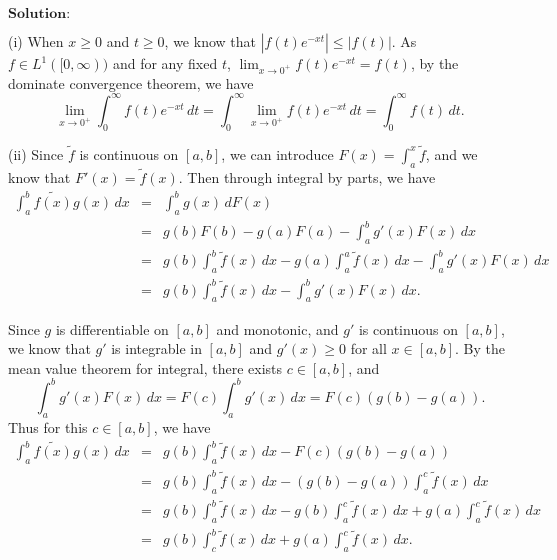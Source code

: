 \documentclass[12pt,a4paper]{ctexart}
\begin{document}
\vspace{8pt}
$\textbf{Solution:}$

(i) When $x \geq 0$ and $t \geq 0$, we know that $|f(t) e^{- x t}| \leq |f(t)|$. As $f \in L^{1}([0, \infty))$ and for any fixed $t$, $\lim_{x \to 0^{+}} f(t) e^{- x t} = f(t)$, by the dominate convergence theorem, we have
\begin{equation*}
    \lim_{x \to 0^{+}} \int_{0}^{\infty} f(t) e^{- x t} \, d t = \int_{0}^{\infty} \lim_{x \to 0^{+}} f(t) e^{- x t} \, d t = \int_{0}^{\infty} f(t) \, d t. 
\end{equation*}

(ii) Since $\tilde{f}$ is continuous on $[a, b]$, we can introduce $F(x) = \int_{a}^{x} \tilde{f}$, and we know that $F'(x) = \tilde{f}(x)$. Then through integral by parts, we have 
\begin{eqnarray*}
\int_{a}^{b} \tilde{f(x)} g(x) \, d x & = & \int_{a}^{b} g(x) \, d F(x) \\
& = & g(b) F(b) - g(a) F(a) - \int_{a}^{b} g'(x) F(x) \, d x  \\
& = & g(b) \int_{a}^{b} \tilde{f} (x) \, d x - g(a) \int_{a}^{a} \tilde{f} (x) \, d x - \int_{a}^{b} g'(x) F(x) \, d x  \\
& = &  g(b) \int_{a}^{b} \tilde{f} (x) \, d x - \int_{a}^{b} g'(x) F(x) \, d x.
\end{eqnarray*}

Since $g$ is differentiable on $[a, b]$ and monotonic, and $g'$ is continuous on $[a, b]$, we know that $g'$ is integrable in $[a, b]$ and $g'(x) \geq 0$ for all $x \in [a, b]$. By the mean value theorem for integral, there exists $c \in [a, b]$, and
\begin{equation*}
   \int_{a}^{b} g'(x) F(x) \, d x = F(c) \int_{a}^{b} g'(x) \, d x = F(c) (g(b) - g(a)).
\end{equation*}
Thus for this $c \in [a, b]$, we have
\begin{eqnarray*}
\int_{a}^{b} \tilde{f(x)} g(x) \, d x & = & g(b) \int_{a}^{b} \tilde{f} (x) \, d x - F(c) (g(b) - g(a)) \\
& = & g(b) \int_{a}^{b} \tilde{f} (x) \, d x - (g(b) - g(a)) \int_{a}^{c} \tilde{f} (x) \, d x \\
& = & g(b) \int_{a}^{b} \tilde{f} (x) \, d x - g(b) \int_{a}^{c} \tilde{f} (x) \, d x + g(a) \int_{a}^{c} \tilde{f} (x) \, d x  \\
& = &  g(b) \int_{c}^{b} \tilde{f} (x) \, d x + g(a) \int_{a}^{c} \tilde{f} (x) \, d x.
\end{eqnarray*}
\end{document}
